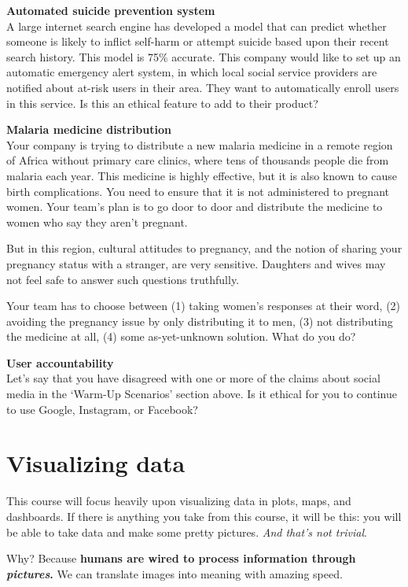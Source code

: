 \documentclass[
]{book}
\begin{document}
\textbf{Automated suicide prevention system}\\
A large internet search engine has developed a model that can predict whether someone is likely to inflict self-harm or attempt suicide based upon their recent search history. This model is 75\% accurate. This company would like to set up an automatic emergency alert system, in which local social service providers are notified about at-risk users in their area. They want to automatically enroll users in this service. Is this an ethical feature to add to their product?

\textbf{Malaria medicine distribution}\\
Your company is trying to distribute a new malaria medicine in a remote region of Africa without primary care clinics, where tens of thousands people die from malaria each year. This medicine is highly effective, but it is also known to cause birth complications. You need to ensure that it is not administered to pregnant women. Your team's plan is to go door to door and distribute the medicine to women who say they aren't pregnant.

But in this region, cultural attitudes to pregnancy, and the notion of sharing your pregnancy status with a stranger, are very sensitive. Daughters and wives may not feel safe to answer such questions truthfully.

Your team has to choose between (1) taking women's responses at their word, (2) avoiding the pregnancy issue by only distributing it to men, (3) not distributing the medicine at all, (4) some as-yet-unknown solution. What do you do?

\textbf{User accountability}\\
Let's say that you have disagreed with one or more of the claims about social media in the `Warm-Up Scenarios' section above. Is it ethical for you to continue to use Google, Instagram, or Facebook?

\hypertarget{dataviz}{%
\chapter{Visualizing data}\label{dataviz}}

This course will focus heavily upon visualizing data in plots, maps, and dashboards. If there is anything you take from this course, it will be this: you will be able to take data and make some pretty pictures. \emph{And that's not trivial}.

Why? Because \textbf{humans are wired to process information through \emph{pictures}.} We can translate images into meaning with amazing speed.
\end{document}
